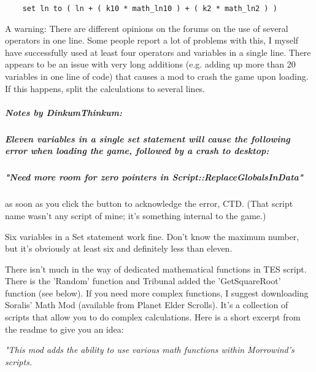 \begin{lstlisting}
	set ln to ( ln + ( k10 * math_ln10 ) + ( k2 * math_ln2 ) )
\end{lstlisting}

A warning: There are different opinions on the forums on the use of
several operators in one line. Some people report a lot of problems with
this, I myself have successfully used at least four operators and
variables in a single line. There appears to be an issue with very long
additions (e.g. adding up more than 20 variables in one line of code)
that causes a mod to crash the game upon loading. If this happens, split
the calculations to several lines.

\hypertarget{notes-by-dinkumthinkum}{%
\subparagraph{Notes by DinkumThinkum:}\label{notes-by-dinkumthinkum}}

\hypertarget{eleven-variables-in-a-single-set-statement-will-cause-the-following-error-when-loading-the-game-followed-by-a-crash-to-desktop}{%
\subparagraph{\texorpdfstring{\emph{Eleven variables in a single set
statement will cause the following error when loading the game, followed
by a crash to
desktop:}}{Eleven variables in a single set statement will cause the following error when loading the game, followed by a crash to desktop:}}\label{eleven-variables-in-a-single-set-statement-will-cause-the-following-error-when-loading-the-game-followed-by-a-crash-to-desktop}}

\hypertarget{need-more-room-for-zero-pointers-in-scriptreplaceglobalsindata}{%
\subparagraph{"Need more room for zero pointers in
Script::ReplaceGlobalsInData"}\label{need-more-room-for-zero-pointers-in-scriptreplaceglobalsindata}}

as soon as you click the button to acknowledge the error, CTD. (That
script name wasn't any script of mine; it's something internal to the
game.)

Six variables in a Set statement work fine. Don't know the maximum
number, but it's obviously at least six and definitely less than eleven.

There isn't much in the way of dedicated mathematical functions in TES
script. There is the 'Random' function and Tribunal added the
'GetSquareRoot' function (see below). If you need more complex
functions, I suggest downloading Soralis' Math Mod (available from
Planet Elder Scrolls). It's a collection of scripts that allow you to do
complex calculations. Here is a short excerpt from the readme to give
you an idea:

\emph{"This mod adds the ability to use various math functions within
Morrowind's scripts.}

